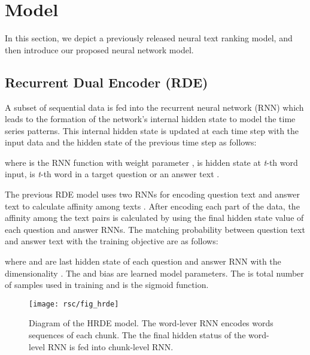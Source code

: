 \documentclass[11pt,a4paper]{article}
\begin{document}
\section{Model}
\label{model}
In this section, we depict a previously released neural text ranking model, and then introduce our proposed neural network model.


\subsection{Recurrent Dual Encoder (RDE)}
A subset of sequential data is fed into the recurrent neural network (RNN) which leads to the formation of the network's internal hidden state  to model the time series patterns. This internal hidden state is updated at each time step with the input data  and the hidden state of the previous time step  as follows:  

where  is the RNN function with weight parameter ,  is hidden state at \textit{t}-th word input,  is \textit{t}-th word in a target question  or an answer text  . 

The previous RDE model uses two RNNs for encoding question text and answer text to calculate affinity among texts \cite{lowe2015ubuntu}.
After encoding each part of the data, the affinity among the text pairs is calculated by using the final hidden state value of each question and answer RNNs. 
The matching probability between question text  and answer text  with the training objective are as follows:

where  and  are last hidden state of each question and answer RNN with the dimensionality . The  and bias  are learned model parameters. The  is total number of samples used in training and  is the sigmoid function. 



\begin{figure}[t]
\centering
\texttt{[image: rsc/fig\_hrde]}
\caption{
Diagram of the HRDE model.
The word-lever RNN encodes words sequences of each chunk. The the final hidden status of the word-level RNN is fed into chunk-level RNN.
}
\label{fig_hrde}
\end{figure}  
\end{document}

